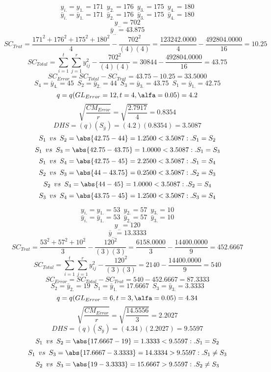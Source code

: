 % 
$$y_{i.}=y_{1.}=171 \enspace y_{2.}=176 \enspace y_{3.}=175 \enspace y_{4.}=180$$
$$\bar{y}_{i.}=\bar{y}_{1.}=171 \enspace \bar{y}_{2.}=176 \enspace \bar{y}_{3.}=175 \enspace \bar{y}_{4.}=180$$
$$y_{..}=702$$
$$\bar{y}_{..}=43.875$$
$$SC_{Trat}=\frac{171^{2}+176^{2}+175^{2}+180^{2}}{4}-\frac{702^{2}}{(4)(4)}=\frac{123242.0000}{4}-\frac{492804.0000}{16}=10.25$$
$$SC_{Total}=\sum_{i=1}^{\mathit{t}}\sum_{j=1}^{\mathit{r}}y_{ij}^{2}-\frac{702^{2}}{(4)(4)}=30844-\frac{492804.0000}{16}=43.75$$
$$SC_{Error}=SC_{Total}-SC_{Trat}=43.75-10.25=33.5000$$
$$S_{4}=\bar{y}_{4.}=45 \enspace S_{2}=\bar{y}_{2.}=44 \enspace S_{3}=\bar{y}_{3.}=43.75 \enspace S_{1}=\bar{y}_{1.}=42.75$$
$$q=q(GL_{Error}=12, t=4, \alfa=0.05)=4.2$$
$$\sqrt{\frac{CM_{Error}}{r}}=\sqrt{\frac{2.7917}{4}}=0.8354$$
$$DHS=(q)(S_{\bar{y}})=(4.2)(0.8354)=3.5087$$
$$S_{1} \enspace vs \enspace S_{2} = \abs{42.75-44}=1.2500<3.5087:.S_{1}=S_{2}$$
$$S_{1} \enspace vs \enspace S_{3} = \abs{42.75-43.75}=1.0000<3.5087:.S_{1}=S_{3}$$
$$S_{1} \enspace vs \enspace S_{4} = \abs{42.75-45}=2.2500<3.5087:.S_{1}=S_{4}$$
$$S_{2} \enspace vs \enspace S_{3} = \abs{44-43.75}=0.2500<3.5087:.S_{2}=S_{3}$$
$$S_{2} \enspace vs \enspace S_{4} = \abs{44-45}=1.0000<3.5087:.S_{2}=S_{4}$$
$$S_{3} \enspace vs \enspace S_{4} = \abs{43.75-45}=1.2500<3.5087:.S_{3}=S_{4}$$

% 
$$y_{i.}=y_{1.}=53 \enspace y_{2.}=57 \enspace y_{3.}=10$$
$$\bar{y}_{i.}=\bar{y}_{1.}=53 \enspace \bar{y}_{2.}=57 \enspace \bar{y}_{3.}=10$$
$$y_{..}=120$$
$$\bar{y}_{..}=13.3333$$
$$SC_{Trat}=\frac{53^{2}+57^{2}+10^{2}}{3}-\frac{120^{2}}{(3)(3)}=\frac{6158.0000}{3}-\frac{14400.0000}{9}=452.6667$$
$$SC_{Total}=\sum_{i=1}^{\mathit{t}}\sum_{j=1}^{\mathit{r}}y_{ij}^{2}-\frac{120^{2}}{(3)(3)}=2140-\frac{14400.0000}{9}=540$$
$$SC_{Error}=SC_{Total}-SC_{Trat}=540-452.6667=87.3333$$
$$S_{2}=\bar{y}_{2.}=19 \enspace S_{1}=\bar{y}_{1.}=17.6667 \enspace S_{3}=\bar{y}_{3.}=3.3333$$
$$q=q(GL_{Error}=6, t=3, \alfa=0.05)=4.34$$
$$\sqrt{\frac{CM_{Error}}{r}}=\sqrt{\frac{14.5556}{3}}=2.2027$$
$$DHS=(q)(S_{\bar{y}})=(4.34)(2.2027)=9.5597$$
$$S_{1} \enspace vs \enspace S_{2} = \abs{17.6667-19}=1.3333<9.5597:.S_{1}=S_{2}$$
$$S_{1} \enspace vs \enspace S_{3} = \abs{17.6667-3.3333}=14.3334>9.5597:.S_{1}\not=S_{3}$$
$$S_{2} \enspace vs \enspace S_{3} = \abs{19-3.3333}=15.6667>9.5597:.S_{2}\not=S_{3}$$